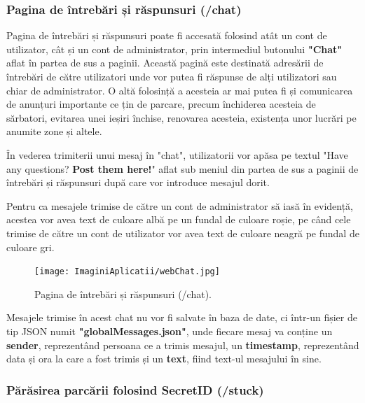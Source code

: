 \documentclass[12pt]{article}
\begin{document}
\subsubsection{Pagina de \^{i}ntreb\u{a}ri și r\u{a}spunsuri (/chat)}

Pagina de \^{i}ntreb\u{a}ri și r\u{a}spunsuri poate fi accesat\u{a} folosind at\^{a}t un cont de utilizator, c\^{a}t și un cont de administrator, prin intermediul butonului \textbf{"Chat"} aflat \^{i}n partea de sus a paginii. Aceast\u{a} pagin\u{a} este destinat\u{a} adres\u{a}rii de \^{i}ntreb\u{a}ri de c\u{a}tre utilizatori unde vor putea fi r\u{a}spunse de alți utilizatori sau chiar de administrator. O alt\u{a} folosinț\u{a} a acesteia ar mai putea fi și comunicarea de anunțuri importante ce țin de parcare, precum \^{i}nchiderea acesteia de s\u{a}rbatori, evitarea unei ieșiri \^{i}nchise, renovarea acesteia, existența unor lucr\u{a}ri pe anumite zone și altele.

\^{I}n vederea trimiterii unui mesaj \^{i}n "chat", utilizatorii vor ap\u{a}sa pe textul "Have any questions? \textbf{Post them here!}" aflat sub meniul din partea de sus a paginii de \^{i}ntreb\u{a}ri și r\u{a}spunsuri dup\u{a} care vor introduce mesajul dorit.

Pentru ca mesajele trimise de c\u{a}tre un cont de administrator s\u{a} ias\u{a} \^{i}n evidenț\u{a}, acestea vor avea text de culoare alb\u{a} pe un fundal de culoare roșie, pe c\^{a}nd cele trimise de c\u{a}tre un cont de utilizator vor avea text de culoare neagr\u{a} pe fundal de culoare gri.

\begin{figure}[H]
  \centering
  \texttt{[image: ImaginiAplicatii/webChat.jpg]}
  \caption{Pagina de \^{i}ntreb\u{a}ri și r\u{a}spunsuri (/chat).}
  \label{fig:aplicatie_chat}
\end{figure}

Mesajele trimise \^{i}n acest chat nu vor fi salvate \^{i}n baza de date, ci \^{i}ntr-un fișier de tip JSON numit \textbf{"globalMessages.json"}, unde fiecare mesaj va conține un \textbf{sender}, reprezent\^{a}nd persoana ce a trimis mesajul, un \textbf{timestamp}, reprezent\^{a}nd data și ora la care a fost trimis și un \textbf{text}, fiind text-ul mesajului \^{i}n sine.

\subsubsection{P\u{a}r\u{a}sirea parc\u{a}rii folosind SecretID (/stuck)}
\end{document}
